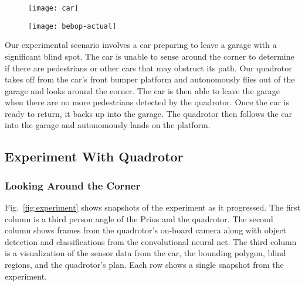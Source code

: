 \begin{figure}[h!]

    \centering

    \texttt{[image: car]}

    \caption{}

    \label{fig:car}

\end{figure}

\begin{figure}[h!]

    \centering

    \texttt{[image: bebop-actual]}

    \caption{}

    \label{fig:bebop-actual}

\end{figure}

Our experimental scenario involves a car preparing to leave a garage with a
significant blind spot. The car is unable to sense around the corner to
determine if there are pedestrians or other cars that may obstruct its path.
Our quadrotor takes off from the car's front bumper platform and autonomously
flies out of the garage and looks around the corner. The car is then able to
leave the garage when there are no more pedestrians detected by the quadrotor.
Once the car is ready to return, it backs up into the garage. The quadrotor
then follows the car into the garage and autonomously lands on the platform.

\subsection{Experiment With Quadrotor}

\subsubsection{Looking Around the Corner}

Fig.~\ref{fig:experiment} shows snapshots of the experiment as it progressed.
The first column is a third person angle of the Prius and the quadrotor. The
second column shows frames from the quadrotor's on-board camera along with
object detection and classifications from the convolutional neural net. The
third column is a visualization of the sensor data from the car, the bounding
polygon, blind regions, and the quadrotor's plan. Each row shows a single
snapshot from the experiment.

